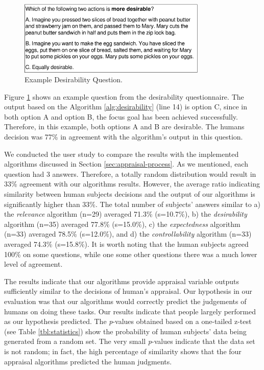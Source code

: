 \begin{figure}[tbh]
  \vspace{-1mm}
  \centering
  \includegraphics[width=0.8\textwidth]{figure/question-sample3-croped.pdf}
  \caption{{\fontsize{9}{9}\selectfont Example Desirability Question.}}
  \label{fig:qs3}
  \vspace{-2mm}
\end{figure}

Figure \ref{fig:qs3} shows an example question from the desirability
questionnaire. The output based on the Algorithm \ref{alg:desirability}
(line 14) is option C, since in both option A and option B, the focus goal
has been achieved successfully. Therefore, in this example, both options A and B
are desirable. The humans decision was 77\% in agreement with the algorithm's
output in this question.

We conducted the user study to compare the results with the implemented
algorithms discussed in Section \ref{sec:appraisal-process}. As we mentioned,
each question had 3 answers. Therefore, a totally random distribution would
result in 33\% agreement with our algorithms results. However, the average
ratio indicating similarity between human subjects decisions and the output of
our algorithms is significantly higher than 33\%. The total number of subjects'
answers similar to a) the \textit{relevance} algorithm (n=29) averaged 71.3\%
(s=10.7\%), b) the \textit{desirability} algorithm (n=35) averaged 77.8\%
(s=15.0\%), c) the \textit{expectedness} algorithm (n=33) averaged 78.5\%
(s=12.0\%), and d) the \textit{controllability} algorithm (n=33) averaged 74.3\%
(s=15.8\%). It is worth noting that the human subjects agreed 100\% on some
questions, while one some other questions there was a much lower level of
agreement.

The results indicate that our algorithms provide appraisal variable outputs
sufficiently similar to the decisions of human's appraisal. Our hypothesis in
our evaluation was that our algorithms would correctly predict the judgements of
humans on doing these tasks. Our results indicate that people largely performed
as our hypothesis predicted. The \textit{p}-values obtained based on a
one-tailed z-test (see Table \ref{tbl:statistics}) show the probability of human
subjects' data being generated from a random set. The very small
\textit{p}-values indicate that the data set is not random; in fact, the high
percentage of similarity shows that the four appraisal algorithms predicted the
human judgments.


